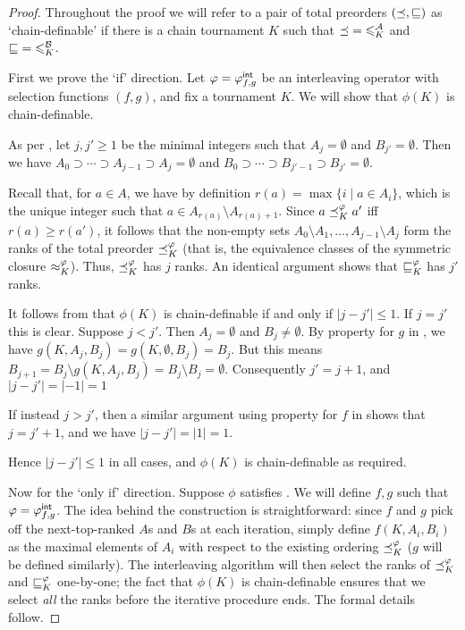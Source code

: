 \begin{proof}

    Throughout the proof we will refer to a pair of total preorders
    $({\preceq}, {\sqsubseteq})$ as `chain-definable' if there is a chain tournament $K$
    such that ${\preceq} = {\leqslant^{\mathcal{A}}_K}$ and ${\sqsubseteq} = {\leqslant^{\mathcal{B}}_K}$.

    First we prove the `if' direction. Let $\varphi = {\varphi_{f,g}^\mathsf{int}}$ be an
    interleaving operator with selection functions $(f, g)$, and fix a
    tournament $K$. We will show that $\phi(K)$ is chain-definable.

    As per , let $j, j' \ge 1$ be the
    minimal integers such that $A_j = \emptyset$ and $B_{j'} = \emptyset$. Then
    we have $A_0 \supset \cdots \supset A_{j-1} \supset A_j = \emptyset$ and
    $B_0 \supset \cdots \supset B_{j'-1} \supset B_{j'} = \emptyset$.

    Recall that, for $a \in A$, we have by definition $r(a) = \max\{i \mid a
    \in A_i\}$, which is the unique integer such that $a \in A_{r(a)} \setminus
    A_{{r(a)}+1}$. Since $a \preceq_K^\varphi a'$ iff $r(a) \ge r(a')$, it follows
    that the non-empty sets $A_0 \setminus A_1, \ldots, A_{j-1} \setminus A_j$
    form the ranks of the total preorder ${\preceq_K^\varphi}$ (that is, the
    equivalence classes of the symmetric closure ${\approx_K^\varphi}$). Thus,
    ${\preceq_K^\varphi}$ has $j$ ranks. An identical argument shows that
    ${\sqsubseteq_K^\varphi}$ has $j'$ ranks.

    It follows from  that $\phi(K)$
    is chain-definable if and only if $|j - j'| \le 1$.  If $j = j'$ this is
    clear. Suppose $j < j'$.  Then $A_j = \emptyset$ and $B_j \ne \emptyset$.
    By property  for $g$ in
    , we have $g(K, A_j, B_j) = g(K, \emptyset,
    B_j) = B_j$. But this means $B_{j+1} = B_j \setminus g(K, A_j, B_j) = B_j
    \setminus B_j = \emptyset$.  Consequently $j' = j+1$, and $|j - j'| = |-1|
    = 1$

    If instead $j > j'$, then a similar argument using property
     for $f$ in  shows
    that $j = j' + 1$, and we have $|j - j'| = |1| = 1$.

    Hence $|j - j'| \le 1$ in all cases, and $\phi(K)$ is chain-definable as
    required.

    Now for the `only if' direction. Suppose $\phi$ satisfies
    . We will define $f, g$ such that $\varphi = {\varphi_{f,g}^\mathsf{int}}$.
    The idea behind the construction is straightforward: since $f$ and $g$ pick
    off the next-top-ranked $A$s and $B$s at each iteration, simply define
    $f(K, A_i, B_i)$ as the maximal elements of $A_i$ with respect to the
    existing ordering ${\preceq_K^\varphi}$ ($g$ will be defined similarly). The
    interleaving algorithm will then select the ranks of ${\preceq_K^\varphi}$ and
    ${\sqsubseteq_K^\varphi}$ one-by-one; the fact that $\phi(K)$ is chain-definable
    ensures that we select \emph{all} the ranks before the iterative procedure
    ends. The formal details follow.


\end{proof}
